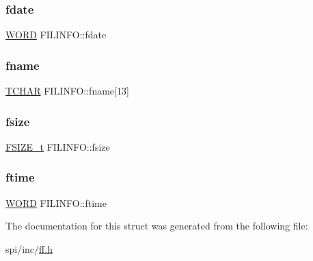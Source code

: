 \mbox{\label{struct_f_i_l_i_n_f_o_a7c01c48a15b1b49da459924437b0bd52}} 
\subsubsection{\texorpdfstring{fdate}{fdate}}
{\footnotesize\ttfamily \mbox{\hyperlink{integer_8h_a197942eefa7db30960ae396d68339b97}{W\+O\+RD}} F\+I\+L\+I\+N\+F\+O\+::fdate}

\mbox{\label{struct_f_i_l_i_n_f_o_abd852510f2f79b4ec773156d8942dc7c}} 
\subsubsection{\texorpdfstring{fname}{fname}}
{\footnotesize\ttfamily \mbox{\hyperlink{ff_8h_a03bdb8ce5895c7e261aadc2529637546}{T\+C\+H\+AR}} F\+I\+L\+I\+N\+F\+O\+::fname\mbox{[}13\mbox{]}}

\mbox{\label{struct_f_i_l_i_n_f_o_a9e5b78ed7190f73de3ebcbdfbd6d1844}} 
\subsubsection{\texorpdfstring{fsize}{fsize}}
{\footnotesize\ttfamily \mbox{\hyperlink{ff_8h_a3fc0992ad7436250b6b1a0592214b7f2}{F\+S\+I\+Z\+E\+\_\+t}} F\+I\+L\+I\+N\+F\+O\+::fsize}

\mbox{\label{struct_f_i_l_i_n_f_o_ae0f751b79621bf7b29669f177bbe6b9a}} 
\subsubsection{\texorpdfstring{ftime}{ftime}}
{\footnotesize\ttfamily \mbox{\hyperlink{integer_8h_a197942eefa7db30960ae396d68339b97}{W\+O\+RD}} F\+I\+L\+I\+N\+F\+O\+::ftime}



The documentation for this struct was generated from the following file\+:\begin{DoxyCompactItemize}
\item 
spi/inc/\mbox{\hyperlink{ff_8h}{ff.\+h}}\end{DoxyCompactItemize}
